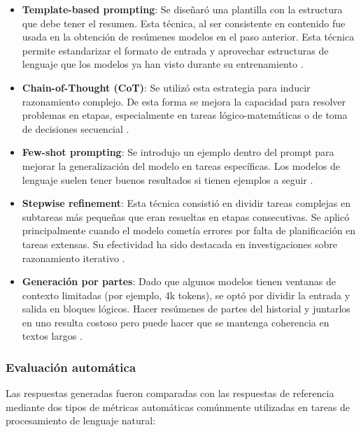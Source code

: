 \documentclass[../main.tex]{subfiles}
\begin{document}
	\begin{itemize}
		\item \textbf{Template-based prompting}: Se diseñaró una plantilla con la estructura que debe tener el resumen. Esta técnica, al ser consistente en contenido fue usada en la obtención de resúmenes modelos en el paso anterior. Esta técnica permite estandarizar el formato de entrada y aprovechar estructuras de lenguaje que los modelos ya han visto durante su entrenamiento \parencite{brown2020languagemodelsfewshotlearners}. 
		
		\item \textbf{Chain-of-Thought (CoT)}: Se utilizó esta estrategia para inducir razonamiento complejo. De esta forma se mejora la capacidad para resolver problemas en etapas, especialmente en tareas lógico-matemáticas o de toma de decisiones secuencial \parencite{wei2023chainofthoughtpromptingelicitsreasoning}.
		
		\item \textbf{Few-shot prompting}: Se introdujo un ejemplo dentro del prompt para mejorar la generalización del modelo en tareas específicas. Los modelos de lenguaje suelen tener buenos resultados si tienen ejemplos a seguir \parencite{parnami2022learningexamplessummaryapproaches}.
		
		\item \textbf{Stepwise refinement}: Esta técnica consistió en dividir tareas complejas en subtareas más pequeñas que eran resueltas en etapas consecutivas. Se aplicó principalmente cuando el modelo cometía errores por falta de planificación en tareas extensas. Su efectividad ha sido destacada en investigaciones sobre razonamiento iterativo \parencite{sun2024promptchainingstepwiseprompt}.
		
		\item \textbf{Generación por partes}: Dado que algunos modelos tienen ventanas de contexto limitadas (por ejemplo, 4k tokens), se optó por dividir la entrada y salida en bloques lógicos. Hacer resúmenes de partes del historial y juntarlos en uno resulta costoso pero puede hacer que se mantenga coherencia en textos largos \parencite{press2023measuringnarrowingcompositionalitygap}.
	\end{itemize}
	
	
	\subsubsection{Evaluación automática}
	
	Las respuestas generadas fueron comparadas con las respuestas de referencia mediante dos tipos de métricas automáticas comúnmente utilizadas en tareas de procesamiento de lenguaje natural:
	
\end{document}
